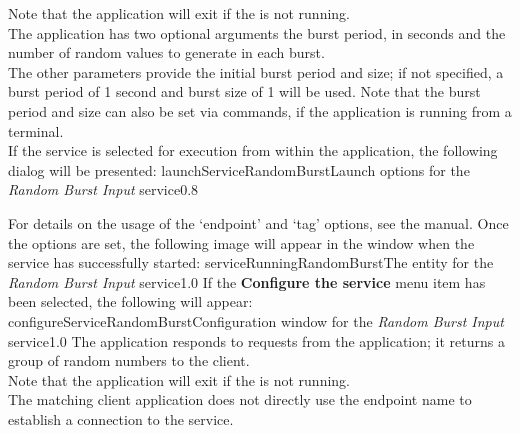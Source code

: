 Note that the application will exit if the  is not
running.\\

The application has two optional arguments \longDash{} the burst period, in seconds and
the number of random values to generate in each burst.
\insertAppParameters
{}
\insertInputServiceComment\\

The other parameters provide the initial burst period and size; if not specified, a burst
period of 1 second and burst size of 1 will be used.
Note that the burst period and size can also be set via commands, if the application is
running from a terminal.\\

\insertStandardServiceCommands
\condPage
If the service is selected for execution from within the \emph{\MMMU} application, the
following dialog will be presented:
%
{launchServiceRandomBurst}{Launch options for the \emph{Random Burst Input} service}{0.8}

For details on the usage of the `endpoint' and `tag' options, see the \emph{\MMMU} manual.
Once the options are set, the following image will appear in the \emph{\MMMU} window when
the service has successfully started:
%
{serviceRunningRandomBurst}{The \emph{\MMMU} entity for the \emph{Random Burst Input}
service}{1.0}
\condPage{}
If the \textbf{Configure the service} menu item has been selected, the following will
appear:
%
{configureServiceRandomBurst}{Configuration window for the \emph{Random Burst Input}
service}{1.0}
\condPage
{}
The  application responds to
 requests from the
 application; it returns a group of random
numbers to the client.\\

Note that the application will exit if the  is not
running.\\

\insertAutoAppParameters
{}
The matching client application does not directly use the endpoint name to establish a
connection to the service.\\

